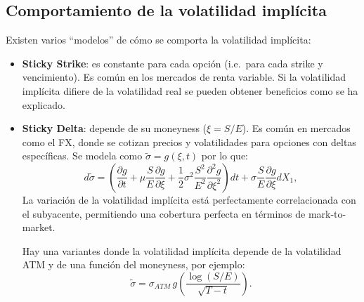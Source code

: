 \subsection{Comportamiento de la volatilidad implícita}
Existen varios ``modelos'' de cómo se comporta la volatilidad implícita:
\begin{itemize}
    \item \textbf{Sticky Strike}: es constante para cada opción (i.e.\ para cada strike y vencimiento). Es común en los mercados de renta variable. Si la volatilidad implícita difiere de la volatilidad real se pueden obtener beneficios como se ha explicado.
    \item \textbf{Sticky Delta}: depende de su moneyness ($\xi = S/E$). Es común en mercados como el FX, donde se cotizan precios y volatilidades para opciones con deltas específicas. Se modela como $\tilde{\sigma} = g(\xi, t)$ por lo que:
    \[
        d\tilde{\sigma} = \left( \frac{\partial g}{\partial t} + \mu \frac{S}{E} \frac{\partial g}{\partial \xi} + \frac{1}{2} \sigma^2 \frac{S^2}{E^2} \frac{\partial^2 g}{\partial \xi^2} \right) dt + \sigma \frac{S}{E} \frac{\partial g}{\partial \xi} dX_1,
    \]
    La variación de la volatilidad implícita está perfectamente correlacionada con el subyacente, permitiendo una cobertura perfecta en términos de mark-to-market.

    Hay una variantes donde la volatilidad implícita depende de la volatilidad ATM y de una función del moneyness, por ejemplo:
    \[
        \tilde{\sigma} = \sigma_{ATM} \, g\left( \frac{\log(S/E)}{\sqrt{T-t}} \right).
    \]
\end{itemize}





